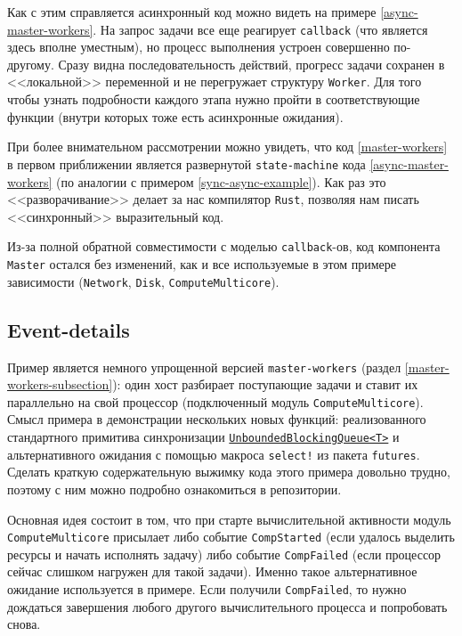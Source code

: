 Как с этим справляется асинхронный код можно видеть на примере \ref{async-master-workers}. На запрос задачи все еще реагирует \texttt{callback} (что является здесь вполне уместным), но процесс выполнения устроен совершенно по-другому. Сразу видна последовательность действий, прогресс задачи сохранен в <<локальной>> переменной и не перегружает структуру \texttt{Worker}. Для того чтобы узнать подробности каждого этапа нужно пройти в соответствующие функции (внутри которых тоже есть асинхронные ожидания). 

При более внимательном рассмотрении можно увидеть, что код \ref{master-workers} в первом приближении является развернутой \texttt{state-machine} кода \ref{async-master-workers} (по аналогии с примером \ref{sync-async-example}). Как раз это <<разворачивание>> делает за нас компилятор \texttt{Rust}, позволяя нам писать <<синхронный>> выразительный код.

Из-за полной обратной совместимости с моделью \texttt{callback}-ов, код компонента \texttt{Master} остался без изменений, как и все используемые в этом примере зависимости (\texttt{Network}, \texttt{Disk}, \texttt{ComputeMulticore}).

\subsection{Event-details}
Пример является немного упрощенной версией \texttt{master-workers} (раздел \ref{master-workers-subsection}): один хост разбирает поступающие задачи и ставит их параллельно на свой процессор (подключенный модуль \texttt{ComputeMulticore}). Смысл примера в демонстрации нескольких новых функций: реализованного стандартного примитива синхронизации \hyperref[blockingqueue]{\texttt{UnboundedBlockingQueue<T>}} и альтернативного ожидания с помощью макроса \texttt{select!} из пакета \texttt{futures}. Сделать краткую содержательную выжимку кода этого примера довольно трудно, поэтому с ним можно подробно ознакомиться в репозитории\cite{async-event-details-example}.

Основная идея состоит в том, что при старте вычислительной активности модуль \texttt{ComputeMulticore} присылает либо событие \texttt{CompStarted} (если удалось выделить ресурсы и начать исполнять задачу) либо событие \texttt{CompFailed} (если процессор сейчас слишком нагружен для такой задачи). Именно такое альтернативное ожидание используется в примере. Если получили \texttt{CompFailed}, то нужно дождаться завершения любого другого вычислительного процесса и попробовать снова. 

